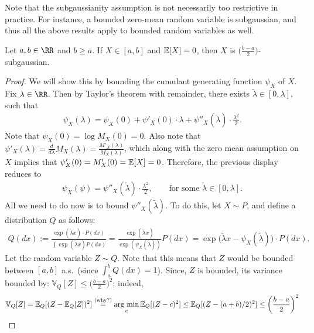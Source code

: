 \documentclass[twoside]{article}
\begin{document}
    Note that the subgaussianity assumption is not necessarily too restrictive in practice. For instance, a bounded zero-mean random variable is subgaussian, and thus all the above results apply to bounded random variables as well.
    \begin{lemma}[Hoeffding's]
      Let $a, b \in \RR$ and $b \geq a$. If $X \in [a, b]$ and $\mathbb{E}[X] = 0$, then $X$ is $\big( \frac{b-a}{2} \big)$-subgaussian.
    \end{lemma}
    \begin{proof}
      We will show this by bounding the cumulant generating function $\psi_X$ of $X$. Fix $\lambda \in \RR$. Then by Taylor's theorem with remainder, there exists $\tilde \lambda \in [0, \lambda]$, such that
      \begin{align*}
        \psi_X(\lambda) = \psi_X(0) + \psi'_X(0) \cdot \lambda + \psi''_X(\tilde \lambda) \cdot \frac{\lambda^2}{2}.
      \end{align*}
      Note that $\psi_X(0) = \log M_X(0) = 0$. Also note that $\psi'_X(\lambda) = \frac{d}{d \lambda} M_X(\lambda) = \frac{M'_X(\lambda)}{M_X(\lambda)}$, which along with the zero mean assumption on $X$ implies that $\psi'_X(0) = M'_X(0) = \mathbb{E}[X] = 0$. Therefore, the previous display reduces to
      \begin{align}
        \psi_X(\psi) = \psi''_X(\tilde \lambda) \cdot \frac{\lambda^2}{2}, \qquad \text{for some } \tilde \lambda \in [0, \lambda]. \label{eq: cgf_taylor_remainder}
      \end{align}
      All we need to do now is to bound $\psi''_X(\tilde \lambda)$. To do this, let $X \sim P$, and define a distribution $Q$ as follows:
      \begin{align*}
        Q(dx) := \frac{\exp (\tilde \lambda x) \cdot P(dx)}{\int \exp (\tilde \lambda x) P(dx)} = \frac{\exp (\tilde \lambda x)}{\exp (\psi_X(\tilde \lambda))} P(dx) = \exp \big( \tilde \lambda x - \psi_X(\tilde \lambda) \big) \cdot P(dx).
      \end{align*}
      Let the random variable $Z \sim Q$. Note that this means that $Z$ would be bounded between $[a, b]$ a.s.\ (since $\int_a^b Q(dx) = 1$). Since, $Z$ is bounded, its variance bounded by: $\mathbb{V}_Q[Z] \leq \big(\frac{b-a}{2}\big)^2$; indeed,
      \begin{align*}
        \mathbb{V}_Q[Z] = \mathbb{E}_Q[(Z - \mathbb{E}_Q[Z])^2] \stackrel{\text{(why?)}}{=} \operatorname*{arg\ min}_{c} \mathbb{E}_Q[(Z - c)^2] \leq \mathbb{E}_Q[(Z - (a+b)/2)^2] \leq \bigg(\frac{b-a}{2}\bigg)^2
      \end{align*}

\end{proof}
\end{document}
